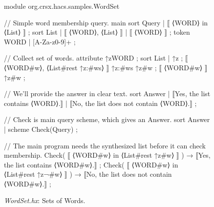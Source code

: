 \documentclass[11pt]{article} %
\begin{document}
\begin{figure}[p]
\begin{hacs}[numbers=right,texcl]
module org.crsx.hacs.samples.WordSet {

// Simple word membership query.
main sort Query | ⟦ ⟨WORD⟩ in ⟨List⟩ ⟧ ;
sort List | ⟦ ⟨WORD⟩, ⟨List⟩ ⟧ | ⟦ ⟨WORD⟩ ⟧ ;
token WORD | [A-Za-z0-9]+ ;

// Collect set of words.
attribute ↑z{WORD} ;
sort List | ↑z ;
⟦ ⟨WORD#w⟩, ⟨List#rest ↑z{:#ws}⟩ ⟧ ↑z{:#ws} ↑z{#w} ;
⟦ ⟨WORD#w⟩ ⟧ ↑z{#w} ;

// We'll provide the answer in clear text.
sort Answer
| ⟦Yes, the list contains ⟨WORD⟩.⟧
| ⟦No, the list does not contain ⟨WORD⟩.⟧
;

// Check is main query scheme, which gives an Answer.
sort Answer | scheme Check(Query) ;

// The main program needs the synthesized list before it can check membership.
Check( ⟦ ⟨WORD#w⟩ in ⟨List#rest ↑z{#w}⟩ ⟧ ) → ⟦Yes, the list contains ⟨WORD#w⟩.⟧ ;
Check( ⟦ ⟨WORD#w⟩ in ⟨List#rest ↑z{¬#w}⟩ ⟧ ) → ⟦No, the list does not contain ⟨WORD#w⟩.⟧ ;
}
\end{hacs}
\caption{\emph{WordSet.hx}: Sets of Words.}
\label{fig:wordset}
\end{figure}
\end{document}
